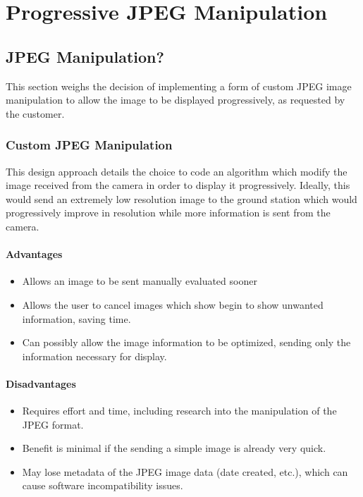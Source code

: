 \section{Progressive JPEG Manipulation}

\subsection*{JPEG Manipulation?}

This section weighs the decision of implementing a form of custom JPEG image manipulation to 
allow the image to be displayed progressively, as requested by the customer.

\subsubsection*{Custom JPEG Manipulation}

This design approach details the choice to code an algorithm which 
modify the image received from the camera in order to display it progressively. 
Ideally, this would send an extremely low resolution image to the ground station which 
would progressively improve in resolution while more information is sent from the camera.

\paragraph*{Advantages}
\begin{itemize}
	\item Allows an image to be sent manually evaluated sooner
	\item Allows the user to cancel images which show begin to show unwanted information, saving time.
	\item Can possibly allow the image information to be optimized, sending only the information necessary for display.
\end{itemize}

\paragraph*{Disadvantages}
\begin{itemize}
	\item Requires effort and time, including research into the manipulation of the JPEG format.
	\item Benefit is minimal if the sending a simple image is already very quick.
	\item May lose metadata of the JPEG image data (date created, etc.), which can cause software incompatibility issues.
\end{itemize}

